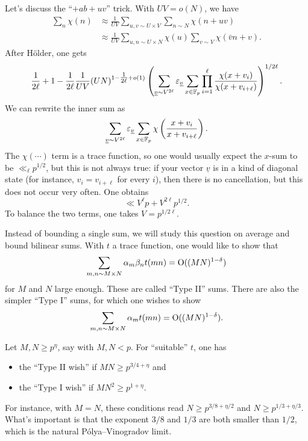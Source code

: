 \documentclass[reqno]{amsart} 
\numberwithin{theorem}{section}
\numberwithin{equation}{section}
\begin{document}
Let's discuss the ``$+ab+uv$'' trick.  With $U V = o(N)$, we have
\begin{align*}
  \sum_n \chi(n) &\approx \frac{1}{U V}
             \sum_{u, v \sim U \times V}
             \sum_{n \sim N}
             \chi(n + u v) \\
           &\approx \frac{1}{U V}
             \sum_{u, n \sim U \times N}
             \chi(u) \sum_{v \sim V}
             \chi(\bar{v} n + v).
\end{align*}
After Hölder, one gets
\begin{equation*}
  \frac{1}{2 \ell} + 1
  -
  \frac{1}{2 \ell}
  \frac{1}{U V}
  (U N)^{1 - \tfrac{1}{2 \ell} + o(1)}
  \left(
    \sum_{\underline{v} \sim V^{2 \ell}}
    \varepsilon_{\underline{v}}
    \sum_{x \in \mathbb{F}_p}
    \prod_{i = 1}^{\ell} \frac{\chi(x + v_i)}{\chi(x + v_{i + \ell})}
  \right)^{1/2 \ell}.
\end{equation*}
We can rewrite the inner sum as
\begin{equation*}
  \sum_{\underline{v} \sim V^{2 \ell}}
  \varepsilon_{\underline{v}}
  \sum_{x \in \mathbb{F}_p} \chi\left(
    \frac{x + v_i}{x + v_{i + \ell}}
  \right).
\end{equation*}
The $\chi(\dotsb)$ term is a trace function, so one would usually expect the $x$-sum to be $\ll_{\ell} p^{1/2}$, but this is not always true: if your vector $\underline{v}$ is in a kind of diagonal state (for instance, $v_i = v_{i + \ell}$ for every $i$), then there is no cancellation, but this does not occur very often.  One obtains
\begin{equation*}
  \ll V^{\ell} p + V^{2 \ell} p^{1/2}.
\end{equation*}
To balance the two terms, one takes $V = p^{1/ 2 \ell}$.

Instead of bounding a single sum, we will study this question on average and bound bilinear sums.  With $t$ a trace function, one would like to show that
\begin{equation*}
  \sum_{m, n \sim M \times N} \alpha_m \beta_n t(m n)
  =
  \operatorname{O}((M N)^{1 - \delta})
\end{equation*}
for $M$ and $N$ large enough.  These are called ``Type II'' sums.  There are also the simpler ``Type I'' sums, for which one wishes to show
\begin{equation*}
  \sum_{m, n \sim M \times N} \alpha_m t(m n) = \operatorname{O}((M N)^{1 - \delta}).
\end{equation*}
\begin{theorem}
  Let $M, N \geq p^\eta$, say with $M, N<p$.  For ``suitable'' $t$, one has
  \begin{itemize}
  \item the ``Type II wish'' if $M N \geq p^{3/4 + \eta}$ and
  \item the ``Type I wish'' if $M N^2 \geq p^{1 + \eta}$.
  \end{itemize}
\end{theorem}
For instance, with $M = N$, these conditions read $N \geq p^{3/8 + \eta/2}$ and $N \geq p^{1/3 + \eta / 3}$.  What's important is that the exponent $3/8$ and $1/3$ are both smaller than $1/2$, which is the natural Pólya--Vinogradov limit.
\end{document}
